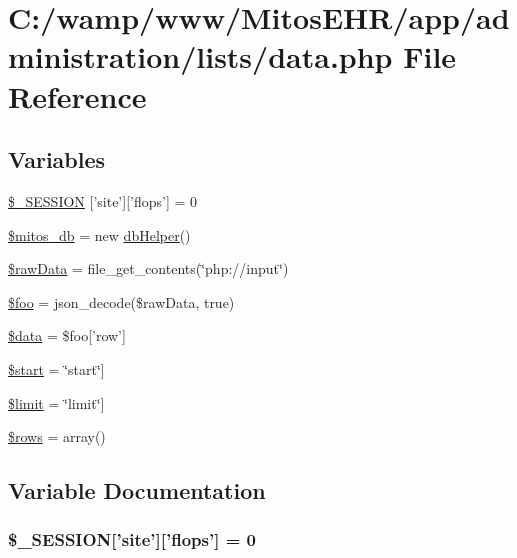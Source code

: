 \hypertarget{administration_2lists_2data_8php}{\section{\-C\-:/wamp/www/\-Mitos\-E\-H\-R/app/administration/lists/data.php \-File \-Reference}
\label{administration_2lists_2data_8php}
}
\subsection*{\-Variables}
\begin{DoxyCompactItemize}
\item 
\hyperlink{administration_2lists_2data_8php_a99fda8552a3e58235643b79f5af3ded8}{\$\-\_\-\-S\-E\-S\-S\-I\-O\-N} \mbox{[}'site'\mbox{]}\mbox{[}'flops'\mbox{]} = 0
\item 
\hyperlink{administration_2lists_2data_8php_ab5d961f93efe4e2e8d8374f01dd6c65a}{\$mitos\-\_\-db} = new \hyperlink{classdb_helper}{db\-Helper}()
\item 
\hyperlink{administration_2lists_2data_8php_ad66cfed6c1f454fbc3f3c6fdc8842a7b}{\$raw\-Data} = file\-\_\-get\-\_\-contents(\char`\"{}php\-://input\char`\"{})
\item 
\hyperlink{administration_2lists_2data_8php_a7a1efa8a0f6183fb3a5e8e8b0696526c}{\$foo} = json\-\_\-decode(\$raw\-Data, true)
\item 
\hyperlink{administration_2lists_2data_8php_a6efc15b5a2314dd4b5aaa556a375c6d6}{\$data} = \$foo\mbox{[}'row'\mbox{]}
\item 
\hyperlink{administration_2lists_2data_8php_a50a00e7de77365e00b117e73aa82fb9b}{\$start} = \char`\"{}start\char`\"{}\mbox{]}
\item 
\hyperlink{administration_2lists_2data_8php_ae05862a0294251c88629b141b5ce329a}{\$limit} = \char`\"{}limit\char`\"{}\mbox{]}
\item 
\hyperlink{administration_2lists_2data_8php_ace2ec39e7df3899fa8df9640ec274b03}{\$rows} = array()
\end{DoxyCompactItemize}


\subsection{\-Variable \-Documentation}
\hypertarget{administration_2lists_2data_8php_a99fda8552a3e58235643b79f5af3ded8}{
\subsubsection[{\$\-\_\-\-S\-E\-S\-S\-I\-O\-N}]{\setlength{\rightskip}{0pt plus 5cm}\$\-\_\-\-S\-E\-S\-S\-I\-O\-N\mbox{[}'site'\mbox{]}\mbox{[}'flops'\mbox{]} = 0}}\label{administration_2lists_2data_8php_a99fda8552a3e58235643b79f5af3ded8}


